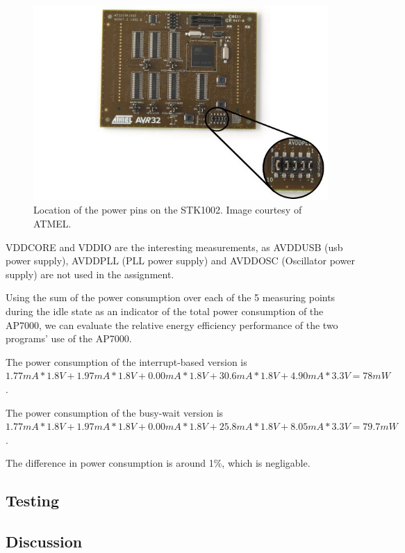 \begin{figure}
\includegraphics[width = \textwidth]{results-and-tests/power-pins-location.jpg}
\caption{Location of the power pins on the STK1002. Image courtesy of ATMEL.}
\label{power-pins-location}
\end{figure}

VDDCORE and VDDIO are the interesting measurements, as AVDDUSB (usb power supply), AVDDPLL (PLL power supply) and AVDDOSC (Oscillator power supply) are not used in the assignment.

Using the sum of the power consumption over each of the 5 measuring points during the idle state as an indicator of the total power consumption of the AP7000, we can evaluate the relative energy efficiency performance of the two programs' use of the AP7000.

The power consumption of the interrupt-based version is 
$
1.77mA * 1.8V +
1.97mA * 1.8V +
0.00mA * 1.8V +
30.6mA * 1.8V +
4.90mA * 3.3V
=
78mW
$
.

The power consumption of the busy-wait version is 
$
1.77mA * 1.8V +
1.97mA * 1.8V +
0.00mA * 1.8V +
25.8mA * 1.8V +
8.05mA * 3.3V
=
79.7mW
$
.

The difference in power consumption is around 1\%, which is negligable.


\subsection{Testing}

	

\subsection{Discussion}

    
